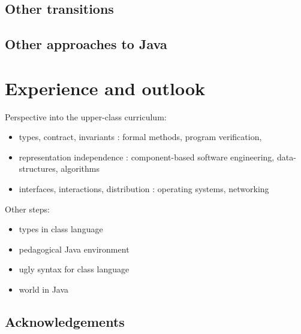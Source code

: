 \documentclass[submission,copyright]{eptcs}
\begin{document}
\subsection{Other transitions}

\cite{dvanhorn:Ragde2008Chilling}
\cite{dvanhorn:Chakravarty2004Risks}

\subsection{Other approaches to Java}

\cite{dvanhorn:Allen2002DrJava, dvanhorn:Hsia2005Taming}

\cite{dvanhorn:Kolling2003}

\cite{dvanhorn:Bruce2001Library}

\cite{dvanhorn:Alphonce2003Using}




\section{Experience and outlook}
\label{sec:conclusion}

Perspective into the upper-class curriculum:

\begin{itemize}
\item types, contract, invariants : formal methods, program verification,
  
\item representation independence : component-based software engineering,
  data-structures, algorithms

\item interfaces, interactions, distribution : operating systems, networking
\end{itemize}


Other steps:
\begin{itemize}
\item types in class language
\item pedagogical Java environment
\item ugly syntax for class language
\item world in Java
\end{itemize}

\cite{dvanhorn:sicp}

\cite{local:htdc}

\subsection*{Acknowledgements}
\end{document}
